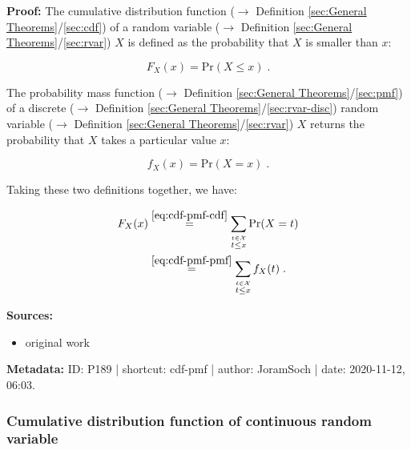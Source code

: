 \documentclass[a4paper,12pt,twoside]{book}
\begin{document}
\vspace{1em}
\textbf{Proof:} The cumulative distribution function ($\rightarrow$ Definition \ref{sec:General Theorems}/\ref{sec:cdf}) of a random variable ($\rightarrow$ Definition \ref{sec:General Theorems}/\ref{sec:rvar}) $X$ is defined as the probability that $X$ is smaller than $x$:

\begin{equation} \label{eq:cdf-pmf-cdf}
F_X(x) = \mathrm{Pr}(X \leq x) \; .
\end{equation}

The probability mass function ($\rightarrow$ Definition \ref{sec:General Theorems}/\ref{sec:pmf}) of a discrete ($\rightarrow$ Definition \ref{sec:General Theorems}/\ref{sec:rvar-disc}) random variable ($\rightarrow$ Definition \ref{sec:General Theorems}/\ref{sec:rvar}) $X$ returns the probability that $X$ takes a particular value $x$:

\begin{equation} \label{eq:cdf-pmf-pmf}
f_X(x) = \mathrm{Pr}(X = x) \; .
\end{equation}

Taking these two definitions together, we have:

\begin{equation} \label{eq:cdf-pmf-cdf-pmf-qed}
\begin{split}
F_X(x) &\overset{\eqref{eq:cdf-pmf-cdf}}{=} \sum_{\overset{t \in \mathcal{X}}{t \leq x}} \mathrm{Pr}(X = t) \\
&\overset{\eqref{eq:cdf-pmf-pmf}}{=} \sum_{\overset{t \in \mathcal{X}}{t \leq x}} f_X(t) \; .
\end{split}
\end{equation}


\vspace{1em}
\textbf{Sources:}
\begin{itemize}
\item original work\end{itemize}


\vspace{1em}
\textbf{Metadata:} ID: P189 | shortcut: cdf-pmf | author: JoramSoch | date: 2020-11-12, 06:03.
\vspace{1em}



\subsubsection[\textbf{Cumulative distribution function of continuous random variable}]{Cumulative distribution function of continuous random variable} \label{sec:cdf-pdf}
\setcounter{equation}{0}
\end{document}
